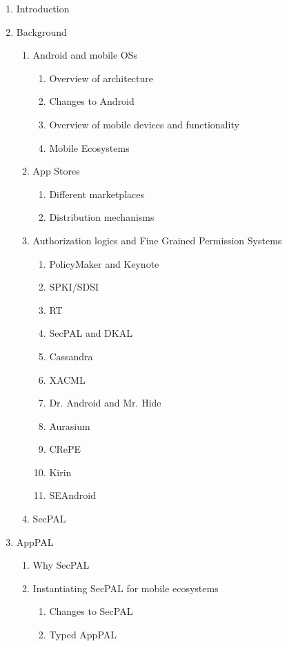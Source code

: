 \documentclass[a4paper]{scrartcl}
\begin{document}
\begin{enumerate}
\item Introduction
\item Background
  \begin{enumerate}[2.1]
  \item Android and mobile OSs
    \begin{enumerate}[2.1.1]
    \item Overview of architecture
    \item Changes to Android
    \item Overview of mobile devices and functionality
    \item Mobile Ecosystems
    \end{enumerate}
  \item App Stores
    \begin{enumerate}[{2.2.}1]
    \item Different marketplaces
    \item Distribution mechanisms
    \end{enumerate}
  \item Authorization logics and Fine Grained Permission Systems
    \begin{enumerate}[{2.3.}1]
    \item PolicyMaker and Keynote
    \item SPKI/SDSI
    \item RT
    \item SecPAL and DKAL
    \item Cassandra
    \item XACML
    \item Dr. Android and Mr. Hide
    \item Aurasium
    \item CRePE
    \item Kirin
    \item SEAndroid
    \end{enumerate}
  \item SecPAL
  \end{enumerate}
\item AppPAL
  \begin{enumerate}[3.1]
  \item Why SecPAL
  \item Instantiating SecPAL for mobile ecosystems
    \begin{enumerate}[{3.2.}1]
    \item Changes to SecPAL
    \item Typed AppPAL

\end{enumerate}
\end{enumerate}
\end{enumerate}
\end{document}
